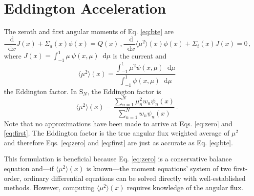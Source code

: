 \documentclass{anstrans}
\newcommand{\SN}{S$_N$\xspace}
\newcommand{\ud}{\mathop{}\!\mathrm{d}} %
\newcommand{\dderiv}[2]{\frac{\ud #1}{\ud #2}}
\newcommand{\edd}{\langle \mu^2 \rangle}
\begin{document}
\section{Eddington Acceleration}
	The zeroth and first angular moments of Eq. \ref{eq:bte} are 
		\begin{subequations} 
		\begin{equation} \label{eq:zero}
			\dderiv{}{x} J(x) + \Sigma_a(x) \phi(x) = Q(x) \,,
		\end{equation} 
		\begin{equation} \label{eq:first}
			\frac{\ud}{\ud x} \edd(x) \phi(x) + \Sigma_t(x) J(x) = 0 \,,
		\end{equation}
		\end{subequations}
	where $J(x) = \int_{-1}^{1} \mu \ \psi(x, \mu) \ud \mu$ is the current and 
		\begin{equation} \label{eq:eddington} 
			\edd(x) = \frac{\int_{-1}^1 \mu^2 \psi(x, \mu) \ud \mu}{\int_{-1}^1 \psi(x, \mu) \ud \mu}
		\end{equation}
	the Eddington factor. In \SN, the Eddington factor is 
		\begin{equation} \label{eq:edd_sn}
			\edd(x) = \frac{\sum_{n=1}^N \mu_n^2 w_n\psi_n(x)}{\sum_{n=1}^N w_n \psi_n(x)} \,.
		\end{equation}
	Note that no approximations have been made to arrive at Eqs. \ref{eq:zero} and \ref{eq:first}. The Eddington factor is the true angular flux weighted average of $\mu^2$ and therefore Eqs. \ref{eq:zero} and \ref{eq:first} are just as accurate as Eq. \ref{eq:bte}. 

	This formulation is beneficial because Eq. \ref{eq:zero} is a conservative balance equation and---if $\edd(x)$ is known---the moment equations' system of two first-order, ordinary differential equations can be solved directly with well-established methods. However, computing $\edd(x)$ requires knowledge of the angular flux. 
\end{document}

